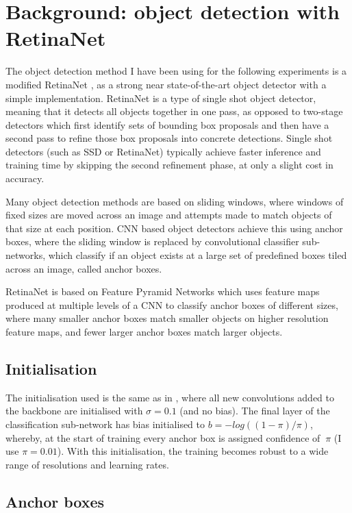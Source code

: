 \section {Background: object detection with RetinaNet}

The object detection method I have been using for the following experiments is a modified RetinaNet \cite{Lin2017}, as a strong near state-of-the-art object detector with a simple implementation. RetinaNet is a type of single shot object detector, meaning that it detects all objects together in one pass, as opposed to two-stage detectors which first identify sets of bounding box proposals and then have a second pass to refine those box proposals into concrete detections. Single shot detectors (such as \gls{SSD} \cite{Liu2016a} or RetinaNet) typically achieve faster inference and training time by skipping the second refinement phase, at only a slight cost in accuracy.  

Many object detection methods are based on sliding windows, where windows of fixed sizes are moved across an image and attempts made to match objects of that size at each position. \gls{CNN} based object detectors achieve this using anchor boxes, where the sliding window is replaced by convolutional classifier sub-networks, which classify if an object exists at a large set of predefined boxes tiled across an image, called anchor boxes. 

RetinaNet is based on Feature Pyramid Networks \cite{Lin2017a} which uses feature maps produced at multiple levels of a \gls{CNN} to classify anchor boxes of different sizes, where many smaller anchor boxes match smaller objects on higher resolution feature maps, and fewer larger anchor boxes match larger objects. 
\subsection{Initialisation}

The initialisation used is the same as in \cite{Lin2017}, where all new convolutions added to the backbone are initialised with $\sigma=0.1$ (and no bias). The final layer of the classification sub-network has bias initialised to $b = −log((1 − \pi)/\pi) $, whereby, at the start of training every anchor box is assigned confidence of $~\pi$ (I use $\pi=0.01$). With this initialisation, the training becomes robust to a wide range of resolutions and learning rates.

\subsection{Anchor boxes}

